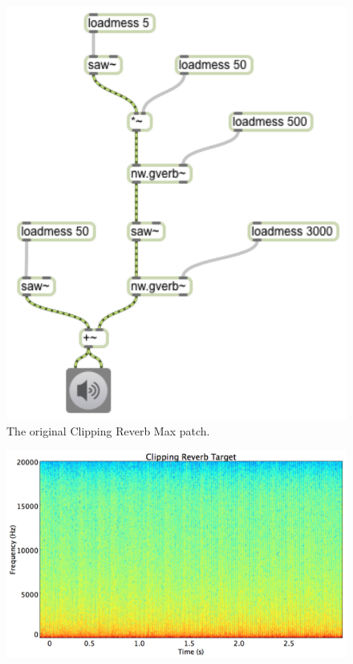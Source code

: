 \documentclass[12pt]{report} 	%
\numberwithin{figure}{chapter}
\numberwithin{table}{chapter}
\numberwithin{equation}{chapter}
\begin{document}
\begin{flushleft}
\begin{figure}[h!]
\begin{center}
\includegraphics[scale=0.8]{ClippingReverbSaw}
\caption[Original clipping reverb Max patch]{The original Clipping Reverb Max patch.}
\end{center}
\end{figure}
\clearpage
\begin{figure}[h!]
\begin{center}
\includegraphics[scale=0.33]{ClippingReverbTargetSTFT}

\end{center}
\end{figure}
\end{flushleft}
\end{document}
